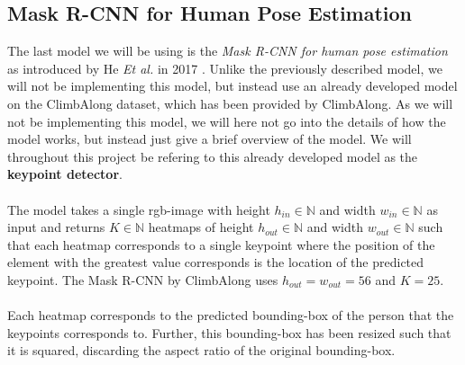 \documentclass[./main.tex]{subfiles}
\begin{document}
\subsection{Mask R-CNN for Human Pose Estimation}
\label{sec:Mask_RCNN}
The last model we will be using is the \textit{Mask R-CNN for human pose estimation} as introduced by He \textit{Et al.} in 2017 \cite{https://doi.org/10.48550/arxiv.1703.06870}. Unlike the previously described model, we will not be implementing this model, but instead use an already  developed model on the ClimbAlong dataset, which has been provided by ClimbAlong. As we will not be implementing this model, we will here not go into the details of how the model works, but instead just give a brief overview of the model. We will throughout this project be refering to this already developed model as the \textbf{keypoint detector}.
\\
\\
The model takes a single rgb-image with height $h_{in} \in \mathbb{N}$ and width $w_{in} \in \mathbb{N}$ as input and returns $K \in \mathbb{N}$ heatmaps of height $h_{out} \in \mathbb{N}$ and width $w_{out} \in \mathbb{N}$ such that each heatmap corresponds to a single keypoint where the position of the element with the greatest value corresponds is the location of the predicted keypoint. The Mask R-CNN by ClimbAlong uses $h_{out} = w_{out} = 56$ and $K = 25$.
\\
\\
Each heatmap corresponds to the predicted bounding-box of the person that the keypoints corresponds to. Further, this bounding-box has been resized such that it is squared, discarding the aspect ratio of the original bounding-box.
\end{document}

